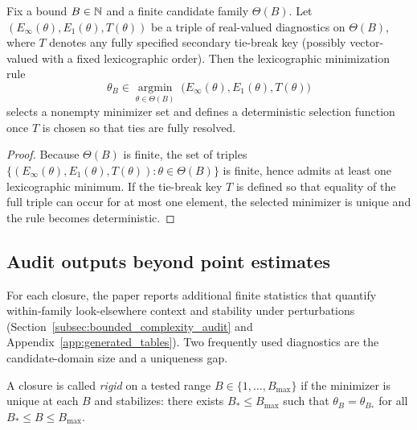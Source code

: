 \begin{proposition}\label{prop:deterministic_closure_map}
Fix a bound $B\in\mathbb{N}$ and a finite candidate family $\Theta(B)$.
Let $(E_\infty(\theta),E_1(\theta),T(\theta))$ be a triple of real-valued diagnostics on $\Theta(B)$, where $T$ denotes any fully specified secondary tie-break key (possibly vector-valued with a fixed lexicographic order).
Then the lexicographic minimization rule
\[
\theta_B\in\operatorname*{argmin}_{\theta\in\Theta(B)}\;\bigl(E_\infty(\theta),E_1(\theta),T(\theta)\bigr)
\]
selects a nonempty minimizer set and defines a deterministic selection function once $T$ is chosen so that ties are fully resolved.
\end{proposition}
\begin{proof}
Because $\Theta(B)$ is finite, the set of triples $\{(E_\infty(\theta),E_1(\theta),T(\theta)):\theta\in\Theta(B)\}$ is finite, hence admits at least one lexicographic minimum.
If the tie-break key $T$ is defined so that equality of the full triple can occur for at most one element, the selected minimizer is unique and the rule becomes deterministic.
\end{proof}

\subsection{Audit outputs beyond point estimates}

For each closure, the paper reports additional finite statistics that quantify within-family look-elsewhere context and stability under perturbations (Section~\ref{subsec:bounded_complexity_audit} and Appendix~\ref{app:generated_tables}).
Two frequently used diagnostics are the candidate-domain size and a uniqueness gap.

\begin{definition}\label{def:rigidity_certificate}
A closure is called \emph{rigid} on a tested range $B\in\{1,\dots,B_{\max}\}$ if the minimizer is unique at each $B$ and stabilizes:
there exists $B_\ast\le B_{\max}$ such that $\theta_B=\theta_{B_\ast}$ for all $B_\ast\le B\le B_{\max}$.
\end{definition}

